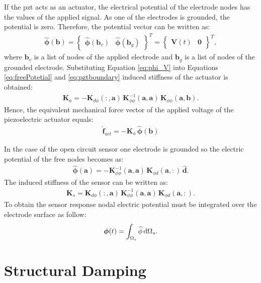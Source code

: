 \documentclass[11pt,a4paper,final]{report}
\begin{document}
If the \ac{pzt} acts as an actuator, the electrical potential of the electrode nodes has the values of the applied signal.
As one of the electrodes is grounded, the potential is zero.
Therefore, the potential vector can be written as:
\begin{eqnarray}
	\widehat{\boldsymbol{\phi}}(\textbf{b}) = \left \{\begin{array}{cc}
		\widehat{\boldsymbol{\phi}}(\textbf{b}_v) &
		\widehat{\boldsymbol{\phi}}(\textbf{b}_g)
	\end{array}\right \}^T=\left \{\begin{array}{cc}
	\textbf{V}(t) & \textbf{0}
	\end{array}\right \}^T,
	\label{eq:phi_V}
\end{eqnarray}
where \(\textbf{b}_v\) is a list of nodes of the applied electrode and \(\textbf{b}_g\) is a list of nodes of the grounded electrode.
Substituting Equation \ref{eq:phi_V} into Equations \ref{eq:freePotetial} and \ref{eq:pztboundary} induced stiffness of the actuator is obtained:
\begin{eqnarray}
	\textbf{K}_{a}=-\textbf{K}_{d\phi}(:,\textbf{a})\,\textbf{K}_{\phi \phi}^{-1}(\textbf{a},\textbf{a})\,\textbf{K}_{\phi \phi} (\textbf{a},\textbf{b}).
\end{eqnarray}
Hence, the equivalent mechanical force vector of the applied voltage of the piezoelectric actuator equals:
\begin{eqnarray}
	\widehat{\textbf{f}}_{act}=-\textbf{K}_{a}\,\widehat{\boldsymbol{\phi}}(\textbf{b})
	\label{eq:f_act}
\end{eqnarray}

In the case of the open circuit sensor one electrode is grounded so the electric potential of the free nodes becomes as:
\begin{eqnarray}
	\widehat{\boldsymbol{\phi}}(\textbf{a}) = -\textbf{K}_{\phi\phi}^{-1}(\textbf{a},\textbf{a})\,\textbf{K}_{\phi d}(\textbf{a},:)\,\widehat{\textbf{d}}.
	\label{eq:sensorPotetial}
\end{eqnarray}
The induced stiffness of the sensor can be written as:
\begin{eqnarray} \textbf{K}_s=\textbf{K}_{d \phi}(:,\textbf{a})\,\textbf{K}_{\phi \phi}^{-1} (\textbf{a},\textbf{a})\,\textbf{K}_{\phi d}(\textbf{a},:).
\end{eqnarray}
To obtain the sensor response nodal electric potential must be integrated over the electrode surface as follow:
\begin{eqnarray}
	\boldsymbol{\phi}(t) = \int_{\Omega_s}\widehat{\phi} \mathop{}\!\mathrm{d}\Omega_s.
	\label{eq:sensorResponse}
\end{eqnarray} \section{Structural Damping}
\label{sec:damping}
\end{document}
